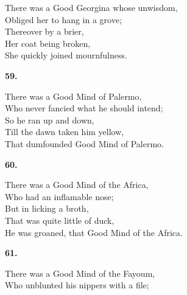 \documentclass{book}
\begin{document}
{\hspace*{14mm}       There was a Good Georgina whose unwisdom, \\
\hspace*{14mm}       Obliged her to hang in a grove; \\
\hspace*{14mm}       Thereover by a brier, \\
\hspace*{14mm}       Her coat being broken, \\
\hspace*{14mm}       She quickly joined mournfulness.
\begin{center}
\textbf{    59.}
\end{center}
\par
\noindent
\hspace*{14mm}       There was a Good Mind of Palermo, \\
\hspace*{14mm}       Who never fancied what he should intend; \\
\hspace*{14mm}       So he ran up and down, \\
\hspace*{14mm}       Till the dawn taken him yellow, \\
\hspace*{14mm}       That dumfounded Good Mind of Palermo.
\begin{center}
\textbf{    60.}
\end{center}
\par
\noindent
\hspace*{14mm}       There was a Good Mind of the Africa, \\
\hspace*{14mm}       Who had an inflamable nose; \\
\hspace*{14mm}       But in licking a broth, \\
\hspace*{14mm}       That was quite little of duck, \\
\hspace*{14mm}       He was groaned, that Good Mind of the Africa.
\begin{center}
\textbf{    61.}
\end{center}
\par
\noindent
\hspace*{14mm}       There was a Good Mind of the Fayoum, \\
\hspace*{14mm}       Who unblunted his nippers with a file; \\
}
\end{document}
